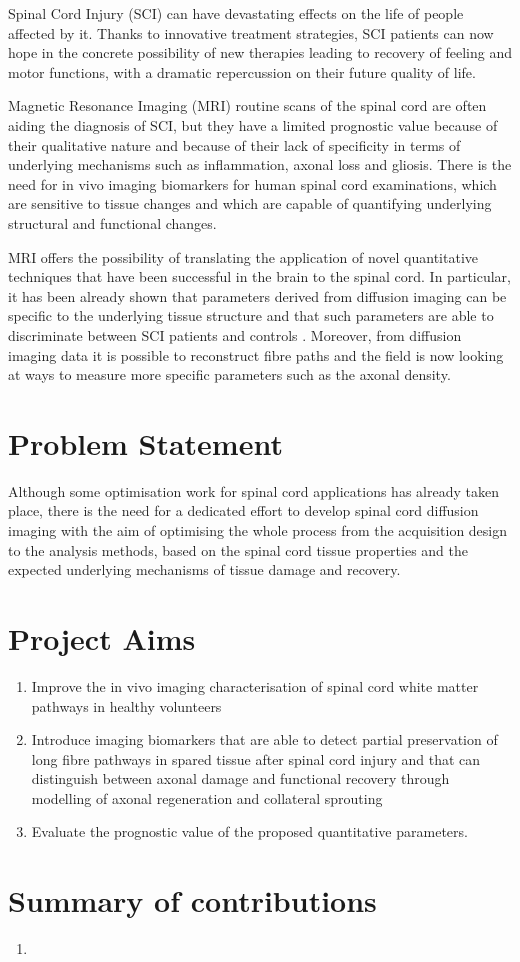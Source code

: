 Spinal Cord Injury (SCI) can have devastating effects on the life of people affected by it. Thanks to innovative treatment strategies, SCI patients can now hope in the concrete possibility of new therapies leading to recovery of feeling and motor functions, with a dramatic repercussion on their future quality of life.

Magnetic Resonance Imaging (MRI) routine scans of the spinal cord are often aiding the diagnosis of SCI, but they have a limited prognostic value because of their qualitative nature and because of their lack of specificity in terms of underlying mechanisms such as inflammation, axonal loss and gliosis. There is the need for in vivo imaging biomarkers for human spinal cord examinations, which are sensitive to tissue changes and which are capable of quantifying underlying structural and functional changes.

MRI offers the possibility of translating the application of novel quantitative techniques that have been successful in the brain to the spinal cord. In particular, it has been already shown that parameters derived from diffusion imaging can be specific to the underlying tissue structure and that such parameters are able to discriminate between SCI patients and controls \cite{TODO}. Moreover, from diffusion imaging data it is possible to reconstruct fibre paths and the field is now looking at ways to measure more specific parameters such as the axonal density.
\section{Problem Statement}
Although some optimisation work for spinal cord applications has already taken place, there is the need for a dedicated effort to develop spinal cord diffusion imaging with the aim of optimising the whole process from the acquisition design to the analysis methods, based on the spinal cord tissue properties and the expected underlying mechanisms of tissue damage and recovery.

\section{Project Aims}
\begin{enumerate}
	\item Improve the in vivo imaging characterisation of spinal cord white matter pathways in healthy volunteers
	\item Introduce imaging biomarkers that are able to detect partial preservation of long fibre pathways in spared tissue after spinal cord injury and that can distinguish between axonal damage and functional recovery through modelling of axonal regeneration and collateral sprouting
	\item Evaluate the prognostic value of the proposed quantitative parameters. 
\end{enumerate}
\section{Summary of contributions}
\begin{enumerate}
	\item 	
\end{enumerate}
